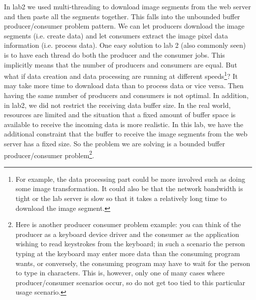 In lab2 we used multi-threading to download image segments from the web server and then paste all the segments together. This falls into the unbounded buffer producer/consumer problem pattern. We can let producers download the image segments (i.e. create data) and let consumers extract the image pixel data information (i.e. process data). One easy solution to lab 2 (also commonly seen) is to have each thread do both the producer and the consumer jobs. This implicitly means that the number of producers and consumers are equal. But what if data creation and data processing are running at different speeds\footnote{For example, the data processing part could be more involved such as doing some image transformation. It could also be that the network bandwidth is tight or the lab server is slow so that it takes a relatively long time to download the image segment.}? It may take more time to download data than to process data or vice versa. Then having the same number of producers and consumers is not optimal. In addition, in lab2, we did not restrict the receiving data buffer size. In the real world, resources are limited and the situation that a fixed amount of buffer space is available to receive the incoming data is more realistic. In this lab, we have the additional constraint that the buffer to receive the image segments from the web server has a fixed size. So the problem we are solving is a bounded buffer producer/consumer problem\footnote{Here is another producer consumer problem example: you can think of the producer as a keyboard device driver and the consumer as the application wishing to read keystrokes from the keyboard; in such a scenario the person typing at the keyboard may enter more data than the consuming  program wants, or conversely, the consuming program may have to wait  for the person to type in characters. This is, however, only one of many cases where producer/consumer scenarios occur, so do not get too tied to this particular usage scenario.}.




